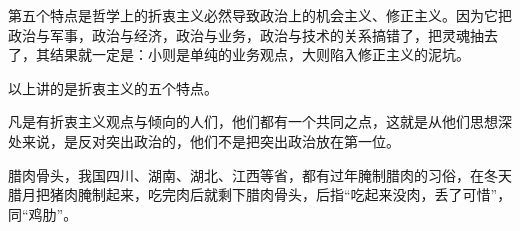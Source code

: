 第五个特点是哲学上的折衷主义必然导致政治上的机会主义、修正主义。因为它把政治与军事，政治与经济，政治与业务，政治与技术的关系搞错了，把灵魂抽去了，其结果就一定是：小则是单纯的业务观点，大则陷入修正主义的泥坑。

以上讲的是折衷主义的五个特点。

凡是有折衷主义观点与倾向的人们，他们都有一个共同之点，这就是从他们思想深处来说，是反对突出政治的，他们不是把突出政治放在第一位。

\begin{maonote}
腊肉骨头，我国四川、湖南、湖北、江西等省，都有过年腌制腊肉的习俗，在冬天腊月把猪肉腌制起来，吃完肉后就剩下腊肉骨头，后指“吃起来没肉，丢了可惜”，同“鸡肋”。
\end{maonote}
